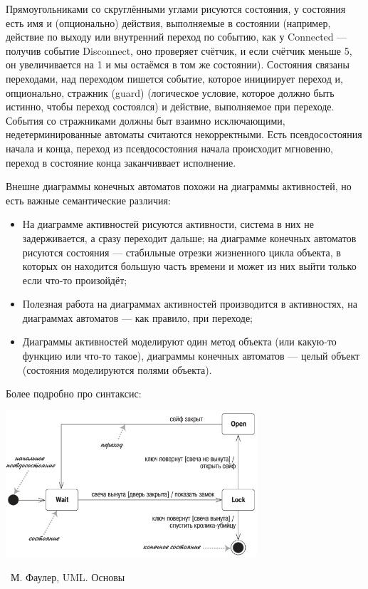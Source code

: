 \documentclass[a5paper]{article}
\newcommand{\attribution}[1] {
	\vspace{-5mm}\begin{flushright}\begin{scriptsize}%
	{\textcopyright\, #1}\end{scriptsize}\end{flushright}
}
\begin{document}
Прямоугольниками со скруглёнными углами рисуются состояния, у состояния есть имя и (опционально) действия, выполняемые в состоянии (например, действие по выходу или внутренний переход по событию, как у Connected --- получив событие Disconnect, оно проверяет счётчик, и если счётчик меньше 5, он увеличивается на 1 и мы остаёмся в том же состоянии). Состояния связаны переходами, над переходом пишется событие, которое инициирует переход и, опционально, стражник (guard) (логическое условие, которое должно быть истинно, чтобы переход состоялся) и действие, выполняемое при переходе. События со стражниками должны быт взаимно исключающими, недетерминированные автоматы считаются некорректными. Есть псевдосостояния начала и конца, переход из псевдосостояния начала происходит мгновенно, переход в состояние конца заканчиввает исполнение.

Внешне диаграммы конечных автоматов похожи на диаграммы активностей, но есть важные семантические различия:

\begin{itemize}
	\item На диаграмме активностей рисуются активности, система в них не задерживается, а сразу переходит дальше; на диаграмме конечных автоматов рисуются состояния --- стабильные отрезки жизненного цикла объекта, в которых он находится большую часть времени и может из них выйти только если что-то произойдёт;
	\item Полезная работа на диаграммах активностей производится в активностях, на диаграммах автоматов --- как правило, при переходе;
	\item Диаграммы активностей моделируют один метод объекта (или какую-то функцию или что-то такое), диаграммы конечных автоматов --- целый объект (состояния моделируются полями объекта).
\end{itemize}

Более подробно про синтаксис:

\begin{center}
	\includegraphics[width=0.7\textwidth]{stateTransitionSyntax.png}
	\attribution{М. Фаулер, UML. Основы}
\end{center}
\end{document}
